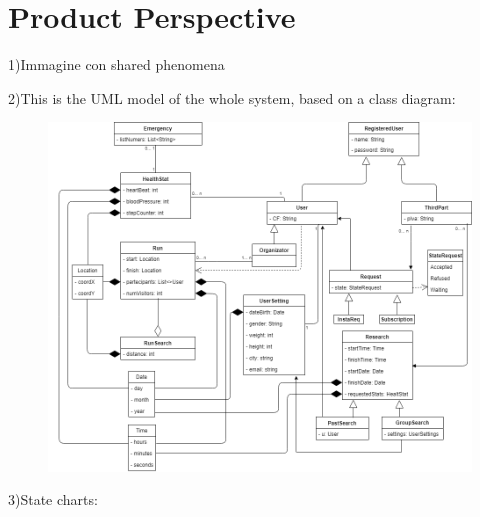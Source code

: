 \section{Product Perspective}
1)Immagine con shared phenomena

2)This is the UML model of  the whole system, based on a class diagram:
\begin{figure}[H]
    \centering
    \includegraphics[scale=0.4]{Pictures/UML.png}
  
\end{figure}
3)State charts:

